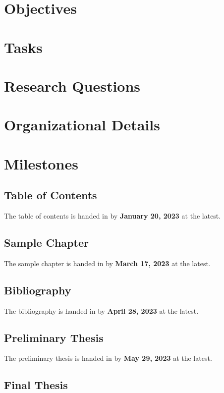 \documentclass[english,notitlepage,smartquotes]{hgbreport}
\begin{document}
\section{Objectives} %

\section{Tasks}

\section{Research Questions}

\section{Organizational Details}

\section{Milestones}

\subsection{Table of Contents}

The table of contents is handed in by \textbf{January 20, 2023} at the latest.

\subsection{Sample Chapter}

The sample chapter is handed in by \textbf{March 17, 2023} at the latest.

\subsection{Bibliography}

The bibliography is handed in by \textbf{April 28, 2023} at the latest.

\subsection{Preliminary Thesis}

The preliminary thesis is handed in by \textbf{May 29, 2023} at the latest.

\subsection{Final Thesis}
\end{document}
